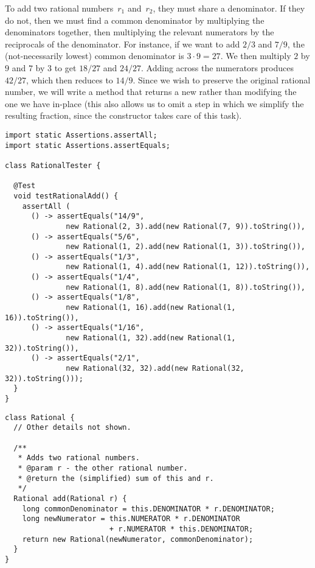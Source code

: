 To add two rational numbers~$r_1$ and~$r_2$, they must share a denominator. If they do not, then we must find a common denominator by multiplying the denominators together, then multiplying the relevant numerators by the reciprocals of the denominator. For instance, if we want to add $2/3$ and $7/9$, the (not-necessarily lowest) common denominator is $3\cdot{9} = 27$. We then multiply $2$ by $9$ and $7$ by $3$ to get $18/27$ and $24/27$. Adding across the numerators produces $42/27$, which then reduces to $14/9$. Since we wish to preserve the original rational number, we will write a method that returns a new  rather than modifying the one we have in-place (this also allows us to omit a step in which we simplify the resulting fraction, since the constructor takes care of this task).

\begin{lstlisting}[language=MyJava]
import static Assertions.assertAll;
import static Assertions.assertEquals;

class RationalTester {

  @Test
  void testRationalAdd() {
    assertAll (
      () -> assertEquals("14/9", 
              new Rational(2, 3).add(new Rational(7, 9)).toString()),
      () -> assertEquals("5/6", 
              new Rational(1, 2).add(new Rational(1, 3)).toString()),
      () -> assertEquals("1/3", 
              new Rational(1, 4).add(new Rational(1, 12)).toString()),
      () -> assertEquals("1/4", 
              new Rational(1, 8).add(new Rational(1, 8)).toString()),
      () -> assertEquals("1/8", 
              new Rational(1, 16).add(new Rational(1, 16)).toString()),
      () -> assertEquals("1/16", 
              new Rational(1, 32).add(new Rational(1, 32)).toString()),
      () -> assertEquals("2/1", 
              new Rational(32, 32).add(new Rational(32, 32)).toString()));
  }
}
\end{lstlisting}

\begin{lstlisting}[language=MyJava]
class Rational {
  // Other details not shown.

  /**
   * Adds two rational numbers.
   * @param r - the other rational number.
   * @return the (simplified) sum of this and r.
   */
  Rational add(Rational r) {
    long commonDenominator = this.DENOMINATOR * r.DENOMINATOR;
    long newNumerator = this.NUMERATOR * r.DENOMINATOR 
                        + r.NUMERATOR * this.DENOMINATOR;
    return new Rational(newNumerator, commonDenominator);
  }
}
\end{lstlisting}

